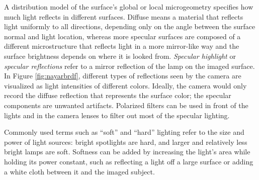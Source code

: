 A distribution model of the surface's global or local microgeometry specifies how much light reflects in different surfaces. \cite{nayar1991surface} %
Diffuse means a material that reflects light uniformly to all directions, depending only on the angle between the surface normal and light location, whereas more specular surfaces are composed of a different microstructure that reflects light in a more mirror-like way and the surface brightness depends on where it is looked from.
\emph{Specular highlight} or \emph{specular reflections} refer to a mirror reflection of the lamp on the imaged surface.
In Figure \ref{fig:nayarbrdf}, different types of reflections seen by the camera are visualized as light intensities of different colors.
Ideally, the camera would only record the diffuse reflection that represents the surface color;
the specular components are unwanted artifacts.
Polarized filters can be used in front of the lights and in the camera lenses to filter out most of the specular lighting.



Commonly used terms such as ``soft'' and ``hard'' lighting refer to the size and power of light sources: bright spotlights are hard, and larger and relatively less bright lamps are soft.
Softness can be added by increasing the light's area while holding its power constant, such as reflecting a light off a large surface or adding a white cloth between it and the imaged subject.

